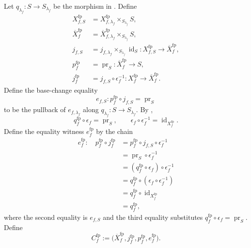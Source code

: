 \begin{definition}
\checked
  \label{def:nagata-final-basechanged-compactification}

  Let $q_{\lambda_f}\colon S\to S_{\lambda_f}$ be the morphism in
  .  Define
  \[
  \begin{aligned}
    X_{f,S}^{\mathrm{fp}}
      &=X_{f,\lambda_f}^{\mathrm{fp}}
        \times_{S_{\lambda_f}}S,\\
    \overline X_f^{\mathrm{fp}}
      &=\overline X_{f,\lambda_f}^{\mathrm{fp}}
        \times_{S_{\lambda_f}}S,\\
    j_{f,S}
      &=j_{f,\lambda_f}\times_{S_{\lambda_f}}\operatorname{id}_S
        \colon X_{f,S}^{\mathrm{fp}}\to\overline X_f^{\mathrm{fp}},\\
    p_f^{\mathrm{fp}}
      &=\operatorname{pr}_S\colon\overline X_f^{\mathrm{fp}}\to S,\\
    j_f^{\mathrm{fp}}
      &=j_{f,S}\circ\epsilon_f^{-1}
        \colon X_f^{\mathrm{fp}}\to\overline X_f^{\mathrm{fp}}.
  \end{aligned}
  \]
  Define the base-change equality
  \[
    e_{f,S}\colon
      p_f^{\mathrm{fp}}\circ j_{f,S}=\operatorname{pr}_S
  \]
  to be the pullback of $e_{f,\lambda_f}$ along
  $q_{\lambda_f}\colon S\to S_{\lambda_f}$.  By
  ,
  \[
    q_f^{\mathrm{fp}}\circ\epsilon_f=\operatorname{pr}_S,
    \qquad
    \epsilon_f\circ\epsilon_f^{-1}
      =\operatorname{id}_{X_f^{\mathrm{fp}}}.
  \]
  Define the equality witness $e_f^{\mathrm{fp}}$ by the chain
  \[
  \begin{aligned}
    e_f^{\mathrm{fp}}\colon\quad
    p_f^{\mathrm{fp}}\circ j_f^{\mathrm{fp}}
      &=p_f^{\mathrm{fp}}\circ j_{f,S}\circ\epsilon_f^{-1}\\
      &=\operatorname{pr}_S\circ\epsilon_f^{-1}\\
      &=(q_f^{\mathrm{fp}}\circ\epsilon_f)\circ\epsilon_f^{-1}\\
      &=q_f^{\mathrm{fp}}\circ
        (\epsilon_f\circ\epsilon_f^{-1})\\
      &=q_f^{\mathrm{fp}}\circ
        \operatorname{id}_{X_f^{\mathrm{fp}}}\\
      &=q_f^{\mathrm{fp}},
  \end{aligned}
  \]
  where the second equality is $e_{f,S}$ and the third equality substitutes
  $q_f^{\mathrm{fp}}\circ\epsilon_f=\operatorname{pr}_S$.  Define
  \[
    C_f^{\mathrm{fp}}
      :=\bigl(\overline X_f^{\mathrm{fp}},j_f^{\mathrm{fp}},
        p_f^{\mathrm{fp}},e_f^{\mathrm{fp}}\bigr).
  \]
\end{definition}

